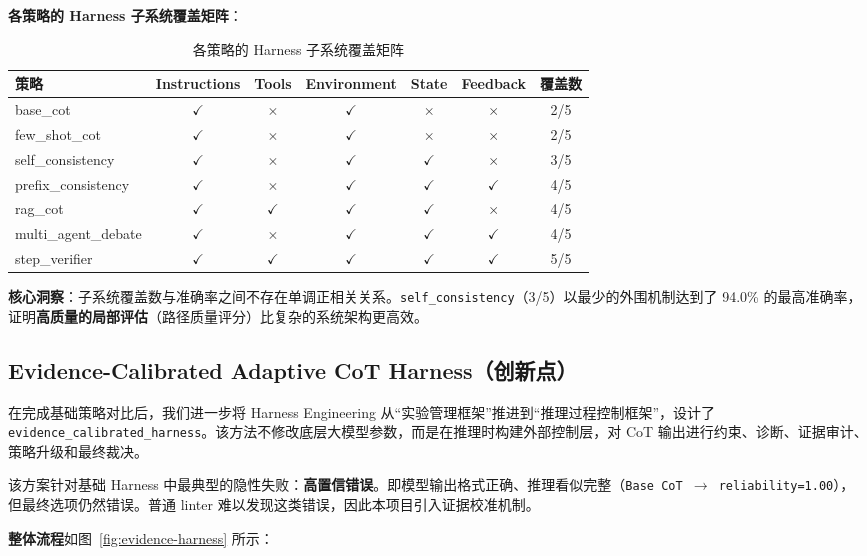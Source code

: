\documentclass[lang=cn,a4paper,newtx]{elegantpaper}
\begin{document}
\textbf{各策略的 Harness 子系统覆盖矩阵}：

\begin{table}[htbp]
\centering
\caption{各策略的 Harness 子系统覆盖矩阵}
\begin{tabular}{lccccc|c}
\toprule
策略 & Instructions & Tools & Environment & State & Feedback & 覆盖数 \\
\midrule
base\_cot & $\checkmark$ & $\times$ & $\checkmark$ & $\times$ & $\times$ & 2/5 \\
few\_shot\_cot & $\checkmark$ & $\times$ & $\checkmark$ & $\times$ & $\times$ & 2/5 \\
self\_consistency & $\checkmark$ & $\times$ & $\checkmark$ & $\checkmark$ & $\times$ & 3/5 \\
prefix\_consistency & $\checkmark$ & $\times$ & $\checkmark$ & $\checkmark$ & $\checkmark$ & 4/5 \\
rag\_cot & $\checkmark$ & $\checkmark$ & $\checkmark$ & $\checkmark$ & $\times$ & 4/5 \\
multi\_agent\_debate & $\checkmark$ & $\times$ & $\checkmark$ & $\checkmark$ & $\checkmark$ & 4/5 \\
step\_verifier & $\checkmark$ & $\checkmark$ & $\checkmark$ & $\checkmark$ & $\checkmark$ & 5/5 \\
\bottomrule
\end{tabular}
\end{table}

\textbf{核心洞察}：子系统覆盖数与准确率之间不存在单调正相关关系。\texttt{self\_consistency}（3/5）以最少的外围机制达到了 94.0\% 的最高准确率，证明\textbf{高质量的局部评估}（路径质量评分）比复杂的系统架构更高效。

\subsection{Evidence-Calibrated Adaptive CoT Harness（创新点）}
\label{sec:evidence-harness}

在完成基础策略对比后，我们进一步将 Harness Engineering 从“实验管理框架”推进到“推理过程控制框架”，设计了 \texttt{evidence\_calibrated\_harness}。该方法不修改底层大模型参数，而是在推理时构建外部控制层，对 CoT 输出进行约束、诊断、证据审计、策略升级和最终裁决。

该方案针对基础 Harness 中最典型的隐性失败：\textbf{高置信错误}。即模型输出格式正确、推理看似完整（\texttt{Base CoT $\to$ reliability=1.00}），但最终选项仍然错误。普通 linter 难以发现这类错误，因此本项目引入证据校准机制。

\textbf{整体流程}如图~\ref{fig:evidence-harness} 所示：
\end{document}
